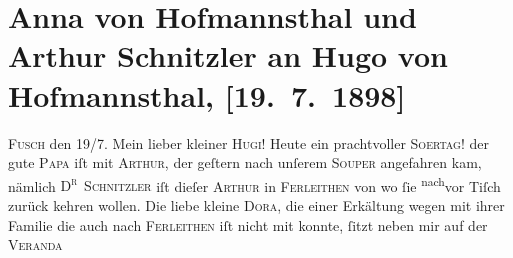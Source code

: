

         
         \renewcommand{\erwaehntePersonen}{Personen: Martin Flatscher, Maria Anna Flatscher, Hugo von Hofmannsthal, Hugo August von Hofmannsthal, Sophie Knepler, Dora Michaelis, Paula Schmidl, Emilie Sgal, Agnes Ulmann, Julie Wassermann}
         \renewcommand{\erwaehnteOrte}{Orte: Ferleiten, Fusch an der Großglocknerstraße, Hotel Weilguni, Tschortkiw}
         \renewcommand{\erwaehnteWerke}{Werke: Liebelei. Schauspiel in drei Akten}
               \section[Anna von Hofmannsthal und Arthur Schnitzler an Hugo von Hofmannsthal, {[}19. 7. 1898{]}]{ Anna von Hofmannsthal und Arthur Schnitzler an Hugo von Hofmannsthal,
               {[}19. 7. 1898{]}}\nopagebreak{}\rehead{ }\begin{ledgroupsized}[t]{13cm}\normalsize\beginnumbering \toendnotes[C]{\smallbreak\pagebreak[2]} 
\toendnotes[C]{\smallbreak}\pstart
           \raggedleft{}{\pb}\textsc{Fusch} den 19/7.\pend
           \pstart\center{}Mein lieber kleiner \textsc{Hugi}!\pend\pstart
           Heute ein prachtvoller \textsc{So{\geminationm}ertag}! der gute \textsc{Papa} iſt mit \textsc{Arthur}, der geſtern nach unſerem \textsc{Souper} angefahren kam, nämlich \textsc{D\textsuperscript{r} Schnitzler} iſt dieſer \textsc{Arthur} in \textsc{Ferleithen} von wo ſie \substVorne{}\textsuperscript{nach}\substDazwischen{}vor\substHinten{} Tiſch zurück kehren wollen. Die liebe kleine \textsc{Dora}, die einer Erkältung wegen mit ihrer Familie die auch nach \textsc{Ferleithen} iſt nicht mit konnte, ſitzt neben mir auf der \textsc{Veranda}

\end{ledgroupsized}
